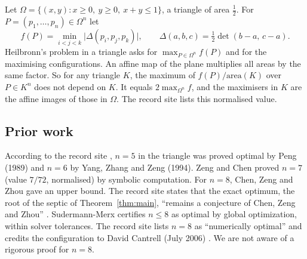 \documentclass[11pt]{amsart}
\theoremstyle{definition}
\newcommand{\Om}{\Omega}
\begin{document}
Let $\Om = \{(x,y) : x \ge 0,\ y \ge 0,\ x + y \le 1\}$, a triangle of area $\frac12$. For $P = (p_1,\dots,p_n) \in \Om^n$ let
\[
  f(P) = \min_{i<j<k} \lvert\Delta(p_i,p_j,p_k)\rvert, \qquad \Delta(a,b,c) = \tfrac12 \det(b-a,\, c-a).
\]
Heilbronn's problem in a triangle asks for $\max_{P \in \Om^n} f(P)$ and for the maximising configurations. An affine map of the plane multiplies all areas by the same factor. So for any triangle $K$, the maximum of $f(P)/\mathrm{area}(K)$ over $P \in K^n$ does not depend on $K$. It equals $2\max_{\Om^n} f$, and the maximisers in $K$ are the affine images of those in $\Om$. The record site \cite{Stead} lists this normalised value. %

\subsection*{Prior work}
According to the record site \cite{Stead}, $n = 5$ in the triangle was proved optimal by Peng (1989) and $n = 6$ by Yang, Zhang and Zeng (1994). Zeng and Chen \cite{ZC19} proved $n = 7$ (value $7/72$, normalised) by symbolic computation. %
For $n = 8$, Chen, Zeng and Zhou \cite{CZZ} gave an upper bound. The record site states that the exact optimum, the root of the septic of Theorem~\ref{thm:main}, ``remains a conjecture of Chen, Zeng and Zhou'' \cite{Stead}. %
Sudermann-Merx \cite{SMtri} certifies $n \le 8$ as optimal by global optimization, within solver tolerances. The record site lists $n = 8$ as ``numerically optimal'' and credits the configuration to David Cantrell (July 2006) \cite{Stead}. %
We are not aware of a rigorous proof for $n = 8$.
\end{document}
